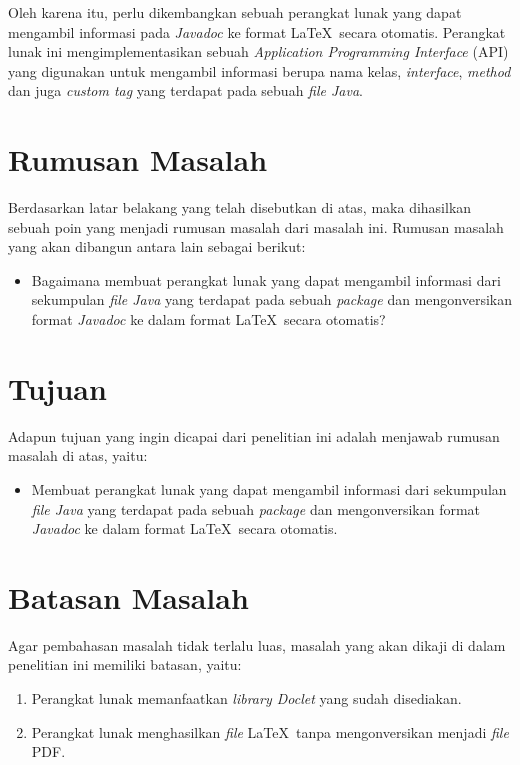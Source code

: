 Oleh karena itu, perlu dikembangkan sebuah perangkat lunak yang dapat mengambil informasi pada {\it Javadoc} ke format \LaTeX\ secara otomatis. Perangkat lunak ini mengimplementasikan sebuah {\it Application Programming Interface} (API) yang digunakan untuk mengambil informasi berupa nama kelas, {\it interface}, {\it method} dan juga {\it custom tag} yang terdapat pada sebuah {\it file Java}.

\section{Rumusan Masalah}
\label{sec:rumusan}
Berdasarkan latar belakang yang telah disebutkan di atas, maka dihasilkan sebuah poin yang menjadi rumusan masalah dari masalah ini. Rumusan masalah yang akan dibangun antara lain sebagai berikut:
\begin{itemize}
	\item Bagaimana membuat perangkat lunak yang dapat mengambil informasi dari sekumpulan {\it file Java} yang terdapat pada sebuah {\it package} dan mengonversikan format {\it Javadoc} ke dalam format \LaTeX\ secara otomatis?
\end{itemize}

\section{Tujuan}
\label{sec:tujuan}
Adapun tujuan yang ingin dicapai dari penelitian ini adalah menjawab rumusan masalah di atas, yaitu:
\begin{itemize}
	\item Membuat perangkat lunak yang dapat mengambil informasi dari sekumpulan {\it file Java} yang terdapat pada sebuah {\it package} dan mengonversikan format {\it Javadoc} ke dalam format \LaTeX\ secara otomatis.
\end{itemize}

\section{Batasan Masalah}
\label{sec:batasan}
Agar pembahasan masalah tidak terlalu luas, masalah yang akan dikaji di dalam penelitian ini memiliki batasan, yaitu:
\begin{enumerate}
	\item Perangkat lunak memanfaatkan {\it library Doclet} yang sudah disediakan.
	\item Perangkat lunak menghasilkan {\it file} \LaTeX\ tanpa mengonversikan menjadi {\it file} PDF. 
\end{enumerate}

